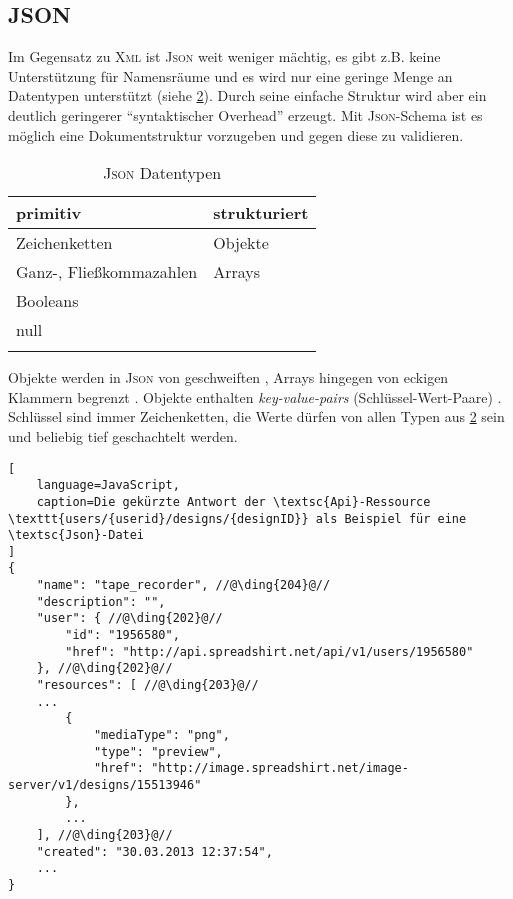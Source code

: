 \subsection{JSON}
\label{sec:json}


Im Gegensatz zu \textsc{Xml} ist \textsc{Json} weit weniger mächtig, es gibt z.B. keine Unterstützung für Namensräume und es wird nur eine geringe Menge an Datentypen unterstützt (siehe \cref{tab:jsonDatatypes}). 
Durch seine einfache Struktur wird aber ein deutlich geringerer \enquote{syntaktischer Overhead} erzeugt.
Mit \textsc{Json}-Schema \cite{json-schema-draft} ist es möglich eine Dokumentstruktur vorzugeben und gegen diese zu validieren. 

\begin{table}[tb]
    \begin{longtable}[c]{l l}
        \toprule
        \rowcolor{lightgray}
        \textbf{primitiv}   & \textbf{strukturiert}\\
        \midrule
        Zeichenketten       & Objekte\\
        Ganz-, 
        Fließkommazahlen    & Arrays\\
        Booleans            & \\
        null                & \\
        \bottomrule
        \caption{\textsc{Json} Datentypen}
        \label{tab:jsonDatatypes}
    \end{longtable}
\end{table}

Objekte werden in \textsc{Json} von geschweiften , Arrays hingegen von eckigen Klammern begrenzt . 
Objekte enthalten \emph{key-value-pairs} (Schlüssel-Wert-Paare) . Schlüssel sind immer Zeichenketten, die Werte dürfen von allen Typen aus \cref{tab:jsonDatatypes} sein und beliebig tief geschachtelt werden.
%
%
\begin{lstlisting}[
    language=JavaScript,
    caption=Die gekürzte Antwort der \textsc{Api}-Ressource \texttt{users/{userid}/designs/{designID}} als Beispiel für eine \textsc{Json}-Datei
]
{
    "name": "tape_recorder", //@\ding{204}@//
    "description": "",
    "user": { //@\ding{202}@//
        "id": "1956580",
        "href": "http://api.spreadshirt.net/api/v1/users/1956580"
    }, //@\ding{202}@//
    "resources": [ //@\ding{203}@//
    ...
        {
            "mediaType": "png",
            "type": "preview",
            "href": "http://image.spreadshirt.net/image-server/v1/designs/15513946"
        }, 
        ...
    ], //@\ding{203}@//
    "created": "30.03.2013 12:37:54",
    ...
}
\end{lstlisting}    
